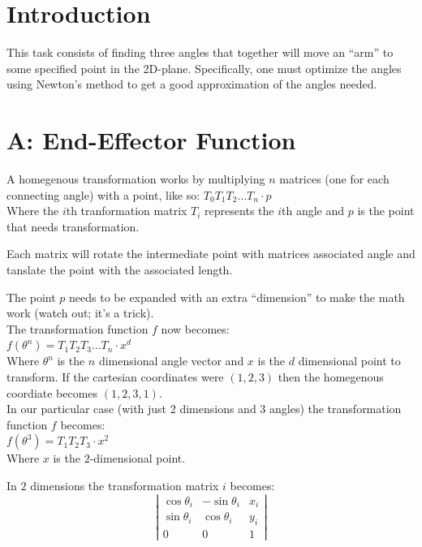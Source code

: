 \documentclass[10pt,oneside,a4paper,final,english]{memoir}
\begin{document}




\maketitle
\newpage


\section{Introduction}
This task consists of finding three angles that together will move an
``arm'' to some specified point in the 2D-plane. Specifically, one
must optimize the angles using Newton's method to get a good
approximation of the angles needed.


\section*{A: End-Effector Function}
A homegenous transformation works by multiplying $n$ matrices (one for
each connecting angle) with a point, like so: $T_0T_1T_2 \ldots T_n
\cdot p$ \\
Where the $i$th tranformation matrix $T_i$ represents the $i$th angle
and $p$ is the point that needs transformation.

Each matrix will rotate the intermediate point with matrices
associated angle and tanslate the point with the associated length.

The point $p$ needs to be expanded with an extra ``dimension'' to make the math
work (watch out; it's a trick). \\

The transformation function $f$ now becomes: \\
$f(\theta^n) = T_1T_2T_3 \ldots T_n \cdot x^d$ \\
Where $\theta^n$ is the $n$ dimensional angle vector and $x$ is the
$d$ dimensional point to transform. If the cartesian coordinates were
$(1,2,3)$ then the homegenous coordiate becomes $(1,2,3,1)$.\\

In our particular case (with just 2 dimensions and 3 angles) the
transformation function $f$ becomes:\\
$f(\theta^3) = T_1T_2T_3 \cdot x^2$\\
Where $x$ is the $2$-dimensional point.

In $2$ dimensions the transformation matrix $i$ becomes:
\[ \left|
  \begin{array}{ccc}
    \cos\theta_i & -\sin\theta_i & x_i \\
    \sin\theta_i & \cos\theta_i & y_i \\
    0 & 0 & 1
  \end{array}
\right| \]
\end{document}
